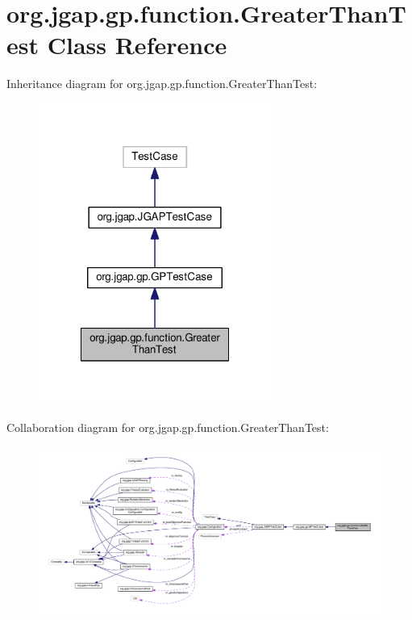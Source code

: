 \hypertarget{classorg_1_1jgap_1_1gp_1_1function_1_1_greater_than_test}{\section{org.\-jgap.\-gp.\-function.\-Greater\-Than\-Test Class Reference}
\label{classorg_1_1jgap_1_1gp_1_1function_1_1_greater_than_test}
}


Inheritance diagram for org.\-jgap.\-gp.\-function.\-Greater\-Than\-Test\-:
\nopagebreak
\begin{figure}[H]
\begin{center}
\leavevmode
\includegraphics[width=216pt]{classorg_1_1jgap_1_1gp_1_1function_1_1_greater_than_test__inherit__graph}
\end{center}
\end{figure}


Collaboration diagram for org.\-jgap.\-gp.\-function.\-Greater\-Than\-Test\-:
\nopagebreak
\begin{figure}[H]
\begin{center}
\leavevmode
\includegraphics[width=350pt]{classorg_1_1jgap_1_1gp_1_1function_1_1_greater_than_test__coll__graph}
\end{center}
\end{figure}
